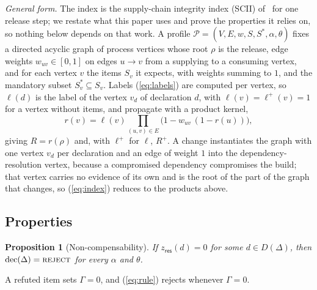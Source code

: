 \documentclass[conference]{IEEEtran}
\newcommand{\sres}{\mathsf{res}}
\newcommand{\dec}[1]{\textsc{#1}}
\newcommand{\Prof}{\mathcal{P}}
\newcommand{\Dec}{\mathrm{dec}}
\newtheorem{proposition}{Proposition}
\begin{document}
\emph{General form.} The index is the supply-chain integrity index (SCII) of~\cite{anon2026evidence} for one release
step; we restate what this paper uses and prove the properties it relies on, so nothing below depends on that work. A
profile $\Prof=(V,E,w,S,S^{*},\alpha,\theta)$ fixes a directed acyclic graph of process vertices whose root $\rho$ is
the release, edge weights $w_{uv}\in[0,1]$ on edges $u\to v$ from a supplying to a consuming vertex, and for each
vertex $v$ the items $S_v$ it expects, with weights summing to $1$, and the mandatory subset $S^{*}_v\subseteq S_v$.
Labels (\ref{eq:labels}) are computed per vertex, so $\ell(d)$ is the label of the vertex $v_d$ of declaration $d$,
with $\ell(v)=\ell^{+}(v)=1$ for a vertex without items, and propagate with a product kernel,
\begin{equation}
r(v)=\ell(v)\prod_{(u,v)\in E}\bigl(1-w_{uv}\,(1-r(u))\bigr),
\label{eq:index}
\end{equation}
giving $R=r(\rho)$ and, with $\ell^{+}$ for $\ell$, $R^{+}$. A change instantiates the graph with one vertex $v_d$
per declaration and an edge of weight $1$ into the dependency-resolution vertex, because a compromised dependency
compromises the build; that vertex carries no evidence of its own and is the root of the part of the graph that
changes, so (\ref{eq:index}) reduces to the products above.

\subsection{Properties}
\begin{proposition}[Non-compensability]
If $z_{\sres}(d)=0$ for some $d\in D(\Delta)$, then $\Dec(\Delta)=\dec{reject}$ for every $\alpha$ and $\theta$.
\end{proposition}
\begin{IEEEproof}
A refuted item sets $\Gamma=0$, and (\ref{eq:rule}) rejects whenever $\Gamma=0$.
\end{IEEEproof}
\end{document}
